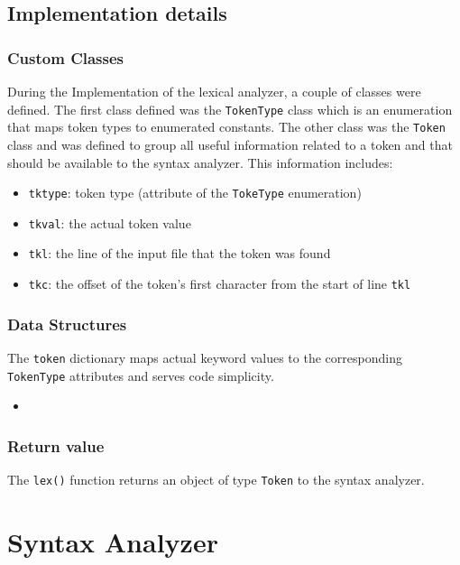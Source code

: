 \documentclass{article}
\newcommand{\pythonscript}[2]{
\begin{itemize}
\item[]
\end{itemize}
}
\def\code#1{\texttt{#1}} %
\begin{document}
\pagebreak

\subsection{Implementation details}

\subsubsection{Custom Classes}
During the Implementation of the lexical analyzer, a couple of classes were defined.
The first class defined was the \code{TokenType} class which is an enumeration that maps token
types to enumerated constants. The other class was the \code{Token} class and was defined to group
all useful information related to a token and that should be available to the syntax analyzer. 
This information includes:
\begin{itemize}
 \item \code{tktype}: token type (attribute of the \code{TokeType} enumeration)
 \item \code{tkval}: the actual token value
 \item \code{tkl}: the line of the input file that the token was found
 \item \code{tkc}: the offset of the token's first character from the start of line \code{tkl}
\end{itemize}


\subsubsection{Data Structures}
The \code{token} dictionary maps actual keyword values to the corresponding \code{TokenType} 
attributes and serves code simplicity.
\pythonscript{token-dict}{Token type/value dictionary}

\subsubsection{Return value}
The \code{lex()} function returns an object of type \code{Token} to the syntax analyzer.


\section{Syntax Analyzer}
\end{document}
